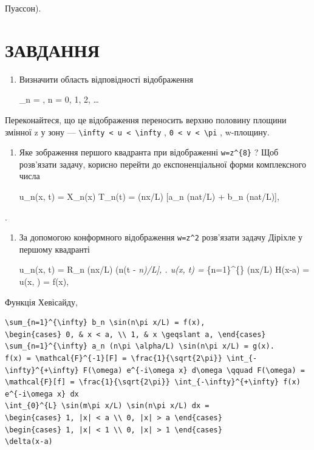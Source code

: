 \documentclass[
  ukrainian,
]{article}
\begin{document}
Пуассон).

\section{ЗАВДАННЯ}\label{ux437ux430ux432ux434ux430ux43dux43dux44f-4}

\begin{enumerate}
\def\labelenumi{\arabic{enumi}.}
\item
  Визначити область відповідності відображення

  \beta\_n = , \quad n = 0, 1, 2, \ldots
\end{enumerate}

Переконайтеся, що це відображення переносить верхню половину площини
змінної z у зону ---
\texttt{\textbackslash{}infty\ \textless{}\ u\ \textless{}\ \textbackslash{}infty}
, \texttt{0\ \textless{}\ v\ \textless{}\ \textbackslash{}pi} ,
w-площину.

\begin{enumerate}
\def\labelenumi{\arabic{enumi}.}
\setcounter{enumi}{1}
\item
  Яке зображення першого квадранта при відображенні
  \texttt{w=z\^{}\{8\}} ? Щоб розв'язати задачу, корисно перейти до
  експоненціальної форми комплексного числа

  u\_n(x, t) = X\_n(x) T\_n(t) = \sin(n\pi x/L) {[}a\_n \sin(n\pi at/L)
  + b\_n \cos(n\pi at/L){]},
\end{enumerate}

.

\begin{enumerate}
\def\labelenumi{\arabic{enumi}.}
\setcounter{enumi}{2}
\item
  За допомогою конформного відображення \texttt{w=z\^{}2} розв'язати
  задачу Діріхле у першому квадранті

  u\_n(x, t) = R\_n \sin(n\pi x/L) \cos(n\pi\alpha (t -
  \delta\emph{n)/L{]}, \right. u(x, t) = \sum}\{n=1\}\^{}\{\infty\}
  \sin(n\pi x/L)
   H(x-a) = u(x, \theta) = f(x),
\end{enumerate}

Функція Хевісайду,

\begin{verbatim}
\sum_{n=1}^{\infty} b_n \sin(n\pi x/L) = f(x),
\begin{cases} 0, & x < a, \\ 1, & x \geqslant a, \end{cases}
\sum_{n=1}^{\infty} a_n (n\pi \alpha/L) \sin(n\pi x/L) = g(x).
f(x) = \mathcal{F}^{-1}[F] = \frac{1}{\sqrt{2\pi}} \int_{-\infty}^{+\infty} F(\omega) e^{-i\omega x} d\omega \qquad F(\omega) = \mathcal{F}[f] = \frac{1}{\sqrt{2\pi}} \int_{-\infty}^{+\infty} f(x) e^{-i\omega x} dx
\int_{0}^{L} \sin(m\pi x/L) \sin(n\pi x/L) dx =
\begin{cases} 1, |x| < a \\ 0, |x| > a \end{cases}
\begin{cases} 1, |x| < 1 \\ 0, |x| > 1 \end{cases}
\delta(x-a)
\end{verbatim}
\end{document}
